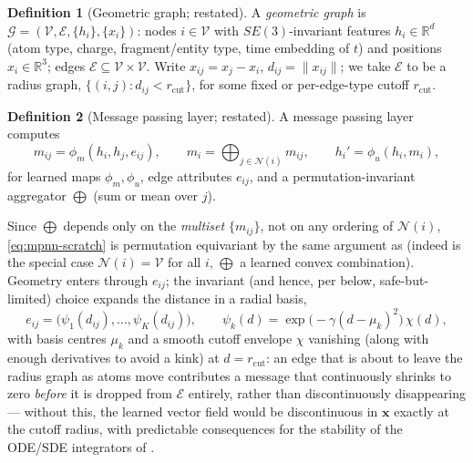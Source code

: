 \documentclass[11pt,a4paper]{report}
\theoremstyle{definition}
\newtheorem{definition}[definition]{Definition}
\theoremstyle{remark}
\newcommand{\RR}{\mathbb R}
\begin{document}
\begin{definition}[Geometric graph; restated]
\label{def:geometric-graph-scratch}
A \emph{geometric graph} is $\mathcal G=(\mathcal V,\mathcal E,\{h_i\},\{x_i\})$:
nodes $i\in\mathcal V$ with $SE(3)$-invariant features $h_i\in\RR^d$ (atom
type, charge, fragment/entity type, time embedding of $t$) and positions
$x_i\in\RR^3$; edges $\mathcal E\subseteq\mathcal V\times\mathcal V$. Write
$x_{ij}=x_j-x_i$, $d_{ij}=\|x_{ij}\|$; we take $\mathcal E$ to be a radius
graph, $\{(i,j):d_{ij}<r_{\mathrm{cut}}\}$, for some fixed or per-edge-type
cutoff $r_{\mathrm{cut}}$.
\end{definition}

\begin{definition}[Message passing layer; restated]
\label{def:mpnn-scratch}
A message passing layer computes
\begin{equation}
\label{eq:mpnn-scratch}
m_{ij} = \phi_m(h_i,h_j,e_{ij}),
\qquad
m_i = \bigoplus_{j\in\mathcal N(i)}m_{ij},
\qquad
h_i' = \phi_u(h_i,m_i),
\end{equation}
for learned maps $\phi_m,\phi_u$, edge attributes $e_{ij}$, and a
permutation-invariant aggregator $\bigoplus$ (sum or mean over $j$).
\end{definition}

Since $\bigoplus$ depends only on the \emph{multiset} $\{m_{ij}\}$, not on
any ordering of $\mathcal N(i)$, \eqref{eq:mpnn-scratch} is permutation
equivariant by the same argument as 
(indeed  is the special case $\mathcal N(i)=\mathcal V$
for all $i$, $\bigoplus$ a learned convex combination). Geometry enters
through $e_{ij}$; the invariant (and hence, per
 below, safe-but-limited) choice expands
the distance in a radial basis,
\begin{equation}
\label{eq:rbf-scratch}
e_{ij} = \bigl(\psi_1(d_{ij}),\dots,\psi_K(d_{ij})\bigr),
\qquad
\psi_k(d) = \exp\bigl(-\gamma(d-\mu_k)^2\bigr)\,\chi(d),
\end{equation}
with basis centres $\mu_k$ and a smooth cutoff envelope $\chi$ vanishing
(along with enough derivatives to avoid a kink) at $d=r_{\mathrm{cut}}$: an
edge that is about to leave the radius graph as atoms move contributes a
message that continuously shrinks to zero \emph{before} it is dropped from
$\mathcal E$ entirely, rather than discontinuously disappearing --- without
this, the learned vector field would be discontinuous in $\mathbf x$
exactly at the cutoff radius, with predictable consequences for the
stability of the ODE/SDE integrators of
.
\end{document}
